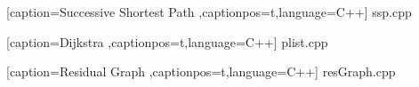 \documentclass[10pt,a4paper]{article}
\author{Janos und Felix}
\begin{document}
 
    [caption={Successive Shortest Path}
       ,captionpos=t,language=C++]
 {ssp.cpp }
  
 [caption={Dijkstra}
       ,captionpos=t,language=C++]
 {plist.cpp}
  
 [caption={Residual Graph}
       ,captionpos=t,language=C++]
 {resGraph.cpp}
\end{document}
